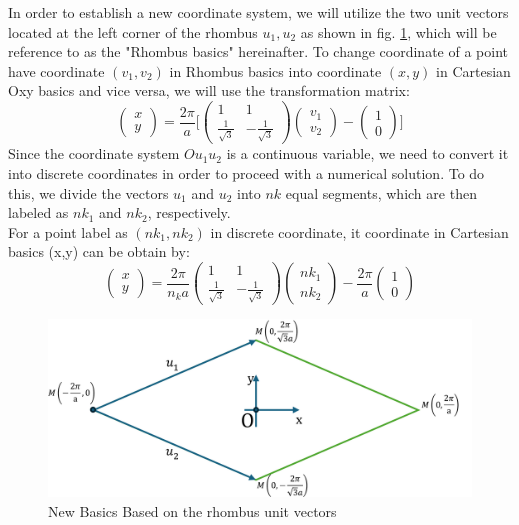 \documentclass[12pt,english,a4paper]{article}
\begin{document}
\quad In order to establish a new coordinate system, we will utilize the two unit vectors located at the left corner of the rhombus $u_1, u_2$ as shown in fig. \ref{rhombuskgrid}, which will be reference to as the "Rhombus basics" hereinafter. To change coordinate of a point have coordinate $(v_1,v_2)$ in Rhombus basics into coordinate $(x,y)$ in Cartesian Oxy basics and vice versa, we will use the transformation matrix:
\begin{equation}
	\begin{pmatrix} x \\ y \end{pmatrix}
	= \frac{2\pi}{a} \biggl[\begin{pmatrix}
		1 & 1\\ \frac{1}{\sqrt{3}} & -\frac{1}{\sqrt{3}}\end{pmatrix}
		\begin{pmatrix} v_1 \\v_2\end{pmatrix}
		-\begin{pmatrix} 1 \\ 0\end{pmatrix}\biggr]
\end{equation}
\quad Since the coordinate system $Ou_1 u_2$ is a continuous variable, we need to convert it into discrete coordinates in order to proceed with a numerical solution. To do this, we divide the vectors $u_1$ and $u_2$ into $nk$ equal segments, which are then labeled as $nk_1$ and $nk_2$, respectively.\\\null
\quad For a point label as $(nk_1,nk_2)$ in discrete coordinate, it coordinate in Cartesian basics (x,y) can be obtain by:
\begin{equation}
	\begin{pmatrix} x \\ y \end{pmatrix}
	= \frac{2\pi}{n_ka} \begin{pmatrix}
		1 & 1\\ \frac{1}{\sqrt{3}} & -\frac{1}{\sqrt{3}}\end{pmatrix}
	\begin{pmatrix} nk_1 \\nk_2\end{pmatrix}
	-\frac{2\pi}{a}\begin{pmatrix} 1 \\ 0\end{pmatrix}
\end{equation}
\begin{figure}
	\begin{center}
		\includegraphics[width=0.5\linewidth]{Images/rhombuskgrid.pdf}
		\caption{New Basics Based on the rhombus unit vectors}
		\label{rhombuskgrid}
	\end{center}
\end{figure}
\end{document}
